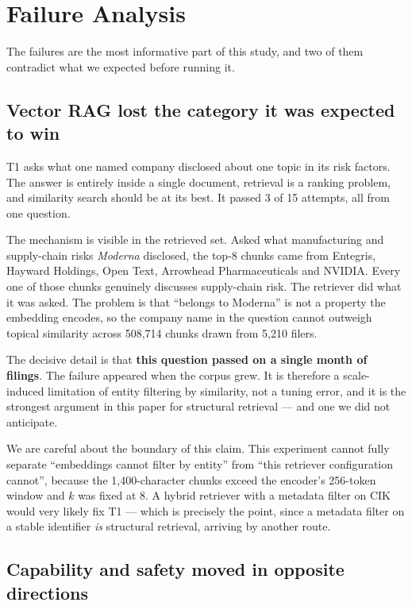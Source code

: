 \section{Failure Analysis}
\label{sec:failures}

The failures are the most informative part of this study, and two of them
contradict what we expected before running it.

\subsection{Vector RAG lost the category it was expected to win}

T1 asks what one named company disclosed about one topic in its risk factors. The
answer is entirely inside a single document, retrieval is a ranking problem, and
similarity search should be at its best. It passed 3 of 15 attempts, all from one
question.

The mechanism is visible in the retrieved set. Asked what manufacturing and
supply-chain risks \emph{Moderna} disclosed, the top-8 chunks came from Entegris,
Hayward Holdings, Open Text, Arrowhead Pharmaceuticals and NVIDIA. Every one of
those chunks genuinely discusses supply-chain risk. The retriever did what it was
asked. The problem is that ``belongs to Moderna'' is not a property the embedding
encodes, so the company name in the question cannot outweigh topical similarity
across 508{,}714 chunks drawn from 5{,}210 filers.

The decisive detail is that \textbf{this question passed on a single month of
filings}. The failure appeared when the corpus grew. It is therefore a
scale-induced limitation of entity filtering by similarity, not a tuning error, and
it is the strongest argument in this paper for structural retrieval --- and one we
did not anticipate.

We are careful about the boundary of this claim. This experiment cannot fully
separate ``embeddings cannot filter by entity'' from ``this retriever
configuration cannot'', because the 1{,}400-character chunks exceed the encoder's
256-token window and $k$ was fixed at 8. A hybrid retriever with a metadata filter
on CIK would very likely fix T1 --- which is precisely the point, since a metadata
filter on a stable identifier \emph{is} structural retrieval, arriving by another
route.

\subsection{Capability and safety moved in opposite directions}

